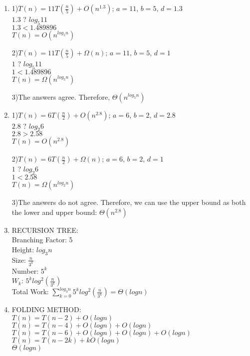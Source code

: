 \documentclass[11pt]{article}
\newenvironment{qparts}{\begin{enumerate}[{(}a{)}]}{\end{enumerate}}
\begin{document}
\begin{qparts}
\item
1)$T(n) = 11T(\frac{n}{5}) + O(n^{1.3})$; $a = 11$, $b = 5$, $d = 1.3$ \\
$1.3$ ? $log_{5}11$ \\
$1.3 < 1.489896$ \\
$T(n) = O(n^{log_{5}n})$

2)$T(n) = 11T(\frac{n}{5}) + \Omega(n)$; $a = 11$, $b = 5$, $d = 1$ \\
$1$ ? $log_{5}11$ \\
$1 < 1.489896$ \\
$T(n) = \Omega(n^{log_{5}n})$ 

3)The answers agree. Therefore, $\Theta(n^{log_{5}n})$

\item
1)$T(n) = 6T(\frac{n}{2}) + O(n^{2.8})$; $a = 6$, $b = 2$, $d = 2.8$ \\
$2.8$ ? $log_{2}6$ \\
$2.8 > 2.58$ \\
$T(n) = O(n^{2.8})$

2)$T(n) = 6T(\frac{n}{2}) + \Omega(n)$; $a = 6$, $b = 2$, $d = 1$ \\
$1$ ? $log_{2}6$ \\
$1 < 2.58$ \\
$T(n) = \Omega(n^{log_{2}n})$ 

3)The answers do not agree. Therefore, we can use the upper bound as both the lower and upper bound: $\Theta(n^{2.8})$

\item
RECURSION TREE:\\
Branching Factor: 5 \\
Height: $log_{3}n$\\
Size: $\frac{n}{3^{k}}$\\
Number: $5^{k}$\\
$W_k$: $5^{k}log^{2}(\frac{n}{3^{k}})$\\
Total Work: $\sum_{k=0}^{log_{3}n} 5^{k}log^{2}(\frac{n}{3^{k}}) = \Theta(logn)$\\


\item
FOLDING METHOD:\\
$T(n) = T(n-2) + O(logn)$ \\
$T(n) = T(n-4) + O(logn) + O(logn)$\\
$T(n) = T(n-6) + O(logn) + O(logn) + O(logn)$ \\
$T(n) = T(n-2k) + kO(logn)$ \\
$\Theta(logn)$

\end{qparts}
\end{document}
